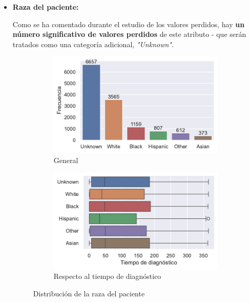 \begin{itemize}[leftmargin=*]
	\item \textbf{Raza del paciente:}
	
	Como se ha comentado durante el estudio de los valores perdidos, hay \textbf{un número significativo de valores perdidos} de este atributo - que serán tratados como una categoría adicional, \textit{"Unknown"}.
	
	\begin{figure}[h]
		\begin{center}
			\begin{subfigure}{0.45\linewidth}
				\begin{center}
					\includegraphics[width=\linewidth]{figs/chapter3/categorical/racedistribution.pdf}
					\caption{General}\label{fig:ch3racedist}
				\end{center}
			\end{subfigure} 
			\begin{subfigure}{0.45\linewidth}
				\begin{center}
					\includegraphics[width=\linewidth]{figs/chapter3/categorical/raceperiod.pdf}
					\caption{Respecto al tiempo de diagnóstico}\label{fig:ch3raceperiod}
				\end{center}
			\end{subfigure} 
		\end{center}
		\captionsetup{aboveskip=-5pt, belowskip=-15pt}
		\caption{Distribución de la raza del paciente}
		\label{fig:ch3race}
	\end{figure}
	

\end{itemize}
